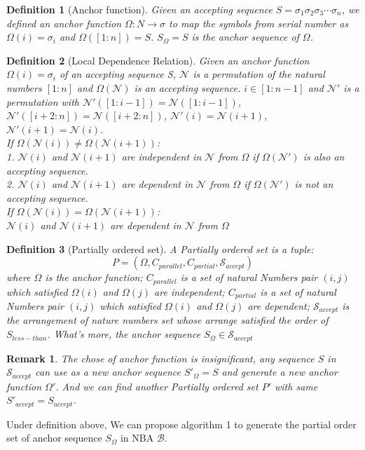 \documentclass[journal]{IEEEtran}
\newtheorem{definition}{Definition}
\newtheorem{remark}{Remark}
\begin{document}
\begin{definition}[Anchor function]
   Given an accepting sequence $S=\sigma_1\sigma_2\sigma_3\cdots\sigma_n$, we defined an anchor function $\Omega:N\rightarrow\sigma$ to map the symbols from serial number as $\Omega(i)=\sigma_i$ and $\Omega([1:n])=S$. $S_\Omega=S$ is the anchor sequence of $\Omega$. 
\end{definition}

\begin{definition}[Local Dependence Relation]
	Given an anchor function $\Omega(i)=\sigma_{i}$ of an accepting sequence S, $\mathcal{N}$ is a permutation of the natural numbers $[1:n]$ and $\Omega(\mathcal{N})$ is an accepting sequence. $i\in [1:n-1]$ and $\mathcal{N}'$ is a permutation with $\mathcal{N}'([1:i-1])=\mathcal{N}([1:i-1])$,$\mathcal{N}'([i+2:n])=\mathcal{N}([i+2:n])$, $\mathcal{N}'(i)=\mathcal{N}(i+1)$, $\mathcal{N}'(i+1)=\mathcal{N}(i)$. \\
	If $\Omega(\mathcal{N}(i))\ne\Omega(\mathcal{N}(i+1))$: \\
	1. $\mathcal{N}(i)$ and $\mathcal{N}(i+1)$ are \emph{independent} in $\mathcal{N}$ from $\Omega$ if $\Omega(\mathcal{N}')$ is also an accepting sequence. \\
	2. $\mathcal{N}(i)$ and $\mathcal{N}(i+1)$ are \emph{dependent} in $\mathcal{N}$ from $\Omega$ if $\Omega(\mathcal{N}')$ is not an accepting sequence.\\
	If $\Omega(\mathcal{N}(i))=\Omega(\mathcal{N}(i+1))$:\\
	 $\mathcal{N}(i)$ and $\mathcal{N}(i+1)$ are \emph{dependent} in $\mathcal{N}$ from $\Omega$
\end{definition}

\begin{definition}[Partially ordered set]
	A Partially ordered set is a tuple:
	$$P=(\Omega,C_{parallel},C_{partial},\mathcal{S}_{accept})$$ 
	where $\Omega$ is the \emph{anchor function}; $C_{parallel}$ is a set of natural Numbers pair $(i,j)$ which satisfied $\Omega(i)$ and $\Omega(j)$ are \emph{independent}; $C_{partial}$ is a set of natural Numbers pair $(i,j)$ which satisfied $\Omega(i)$ and $\Omega(j)$ are \emph{dependent}; $\mathcal{S}_{accept}$ is the arrangement of nature numbers set whose arrange satisfied the order of $S_{less-than}$. What's more, the anchor sequence $S_\Omega\in \mathcal{S}_{accept}$
\end{definition}

\begin{remark}
    The chose of anchor function is insignificant, any sequence $S$ in $\mathcal{S}_{accept}$ can use as a new anchor sequence $S'_\Omega=S$ and generate a new anchor function $\Omega'$. And we can find another Partially ordered set $P'$ with same $S'_{accept}=S_{accept}$.
\end{remark}
   Under definition above, We can propose algorithm 1 to generate the partial order set of anchor sequence $S_\Omega$ in NBA $\mathcal{B}$.
\end{document}
